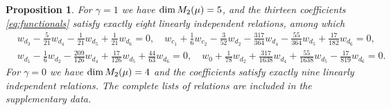 \documentclass[leqno]{article}
\let\cal\relax
\newcommand{\cal}{\mathcal}
\newtheorem{prop}[thm]{Proposition}
\numberwithin{equation}{section}
\begin{document}
\begin{prop}
\label{prop:weight-two-space}
For $\gamma = 1$ we have $\dim \cal M_2(\mu) = 5$, and the thirteen coefficients \eqref{eq:functionals} satisfy exactly eight linearly independent relations, among which
\begin{equation}
\label{eq:relations-gamma-one}
\begin{split}
& w_{d_3}-\tfrac{5}{21}w_{d_4}-\tfrac{1}{21}w_{d_5}+\tfrac{1}{21}w_{d_6} = 0,\quad w_{c_1}+\tfrac16w_{c_2}-\tfrac{3}{52}w_{d_2}-\tfrac{317}{364}w_{d_4}-\tfrac{55}{364}w_{d_5}+\tfrac{17}{182}w_{d_6} = 0,\\
& w_{d_1}-\tfrac16w_{d_2}-\tfrac{209}{126}w_{d_4}+\tfrac{17}{126}w_{d_5}+\tfrac{44}{63}w_{d_6} = 0,\quad w_0+\tfrac{1}{78}w_{d_2}+\tfrac{317}{1638}w_{d_4}+\tfrac{55}{1638}w_{d_5}-\tfrac{17}{819}w_{d_6} = 0.
\end{split}
\end{equation}
For $\gamma = 0$ we have $\dim \cal M_2(\mu) = 4$ and the coefficients satisfy exactly nine linearly independent relations. The complete lists of relations are included in the supplementary data.
\end{prop}
\end{document}
